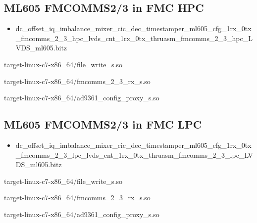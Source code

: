 \subsection{ML605 FMCOMMS2/3 in FMC HPC}
	\begin{itemize}
	\item dc\_offset\_iq\_imbalance\_mixer\_cic\_dec\_timestamper\_ml605\_cfg\_1rx\_0tx \\
\_fmcomms\_2\_3\_hpc\_lvds\_cnt\_1rx\_0tx\_thruasm\_fmcomms\_2\_3\_hpc\_LVDS\_ml605.bitz
	\end{itemize}
	\begin{itemize}
	\begin{minipage}[t]{.5\textwidth}
	\item target-linux-c7-x86\_64/file\_write\_s.so
	\item target-linux-c7-x86\_64/fmcomms\_2\_3\_rx\_s.so
	\item target-linux-c7-x86\_64/ad9361\_config\_proxy\_s.so
	\end{minipage}
	\end{itemize}
\subsection{ML605 FMCOMMS2/3 in FMC LPC}
	\begin{itemize}
	\item dc\_offset\_iq\_imbalance\_mixer\_cic\_dec\_timestamper\_ml605\_cfg\_1rx\_0tx \\
\_fmcomms\_2\_3\_lpc\_lvds\_cnt\_1rx\_0tx\_thruasm\_fmcomms\_2\_3\_lpc\_LVDS\_ml605.bitz
	\end{itemize}
	\begin{itemize}
	\begin{minipage}[t]{.5\textwidth}
	\item target-linux-c7-x86\_64/file\_write\_s.so
	\item target-linux-c7-x86\_64/fmcomms\_2\_3\_rx\_s.so
	\item target-linux-c7-x86\_64/ad9361\_config\_proxy\_s.so
	\end{minipage}
	\end{itemize}
